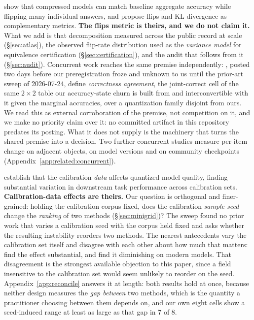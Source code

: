 \citet{dutta2024flips} show that compressed models can match baseline aggregate
accuracy while flipping many individual answers, and propose flips and KL
divergence as complementary metrics. \textbf{The flips metric is theirs, and we
do not claim it.} What we add is that decomposition measured across the public
record at scale (\S\ref{sec:atlas}), the observed flip-rate distribution used as
the \emph{variance model} for equivalence certification
(\S\ref{sec:certification}), and the audit that follows from it
(\S\ref{sec:audit}). Concurrent work reaches the same premise independently:
\citet{rababah2026illusion}, posted two days before our preregistration froze
and unknown to us until the prior-art sweep of 2026-07-24, define
\emph{correctness agreement}, the joint-correct cell of the same $2\times2$
table our accuracy-state churn is built from and interconvertible with it given
the marginal accuracies, over a quantization family disjoint from ours. We read
this as external corroboration of the premise, not competition on it, and we
make no priority claim over it: no committed artifact in this repository
predates its posting. What it does not supply is the machinery that turns the
shared premise into a decision. Two further concurrent studies measure per-item
change on adjacent objects, on model versions and on community checkpoints
(Appendix~\ref{app:related:concurrent}).

\citet{williamsaletras2024} establish that the calibration \emph{data} affects
quantized model quality, finding substantial variation in downstream task
performance across calibration sets. \textbf{Calibration-data effects are
theirs.} Our question is orthogonal and finer-grained: holding the calibration
corpus fixed, does the calibration \emph{sample seed} change the \emph{ranking}
of two methods (\S\ref{sec:minigrid})? The sweep found no prior work that varies
a calibration seed with the corpus held fixed and asks whether the resulting
instability reorders two methods. The nearest antecedents vary the calibration
set itself and disagree with each other about how much that matters:
\citet{williamsaletras2024} find the effect substantial, and
\citet{paglieri2024outliers} find it diminishing on modern models. That
disagreement is the strongest available objection to this paper, since a field
insensitive to the calibration set would seem unlikely to reorder on the seed.
Appendix~\ref{app:reconcile} answers it at length: both results hold at once,
because neither design measures the \emph{gap between} two methods, which is the
quantity a practitioner choosing between them depends on, and our own eight
cells show a seed-induced range at least as large as that gap in 7 of 8.

